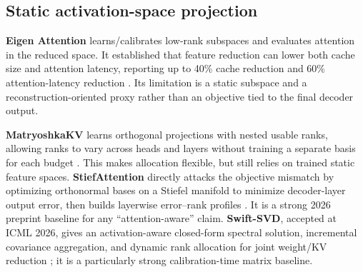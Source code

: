 \documentclass[10pt]{article}
\begin{document}
\begin{center}
\end{center}

\subsection{Static activation-space projection}

\textbf{Eigen Attention} learns/calibrates low-rank subspaces and evaluates attention in the
reduced space. It established that feature reduction can lower both cache size and attention
latency, reporting up to 40\% cache reduction and 60\% attention-latency reduction
\cite{eigen}. Its limitation is a static subspace and a reconstruction-oriented proxy rather than
an objective tied to the final decoder output.

\textbf{MatryoshkaKV} learns orthogonal projections with nested usable ranks, allowing ranks to
vary across heads and layers without training a separate basis for each budget \cite{matryoshka}.
This makes allocation flexible, but still relies on trained static feature spaces.
\textbf{StiefAttention} directly attacks the objective mismatch by optimizing orthonormal bases
on a Stiefel manifold to minimize decoder-layer output error, then builds layerwise error--rank
profiles \cite{stief}. It is a strong 2026 preprint baseline for any ``attention-aware'' claim.
\textbf{Swift-SVD}, accepted at ICML 2026, gives an activation-aware closed-form spectral solution,
incremental covariance aggregation, and dynamic rank allocation for joint weight/KV reduction
\cite{swiftsvd}; it is a particularly strong calibration-time matrix baseline.
\end{document}
